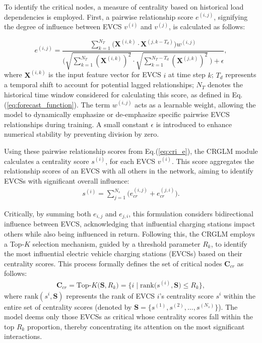 \documentclass[lettersize,journal]{IEEEtran}
\begin{document}
To identify the critical nodes, a measure of centrality based on historical load dependencies is employed.  First, a pairwise relationship score  $e^{(i,j)}$, signifying the degree of influence between EVCS  $v^{(i)}$  and  $v^{(j)}$, is calculated as follows:

\begin{equation}
	e^{(i,j)} = \frac{\sum_{k=1}^{N_T} \Big(\bm{X}^{(i,k)} \cdot \bm{X}^{(j,k-T_d)} \Big) w^{(i,j)}}{\Big(\sqrt{\sum_{k=1}^{N_T} (\bm{X}^{(i,k)})^2} \cdot \sqrt{\sum_{k=1}^{N_T-T_d} (\bm{X}^{(j,k)})^2} ~\Big) + \epsilon},
	\label{eq:cri_e}
\end{equation}
where $\bm{X}^{(i,k)}$ is the input feature vector for EVCS $i$ at time step $k$; $T_d$ represents a temporal shift to account for potential lagged relationships; $N_T$ denotes the historical time window considered for calculating this score, as defined in Eq.(\ref{eq:forecast_function}). The term  $w^{(i,j)}$ acts as a learnable weight, allowing the model to dynamically emphasize or de-emphasize specific pairwise EVCS relationships during training. A small constant $\epsilon$ is introduced to enhance numerical stability by preventing division by zero.   

Using these pairwise relationship scores from  Eq.(\ref{eq:cri_e}), the CRGLM module calculates a centrality score $s^{(i)}$,  for each EVCS $v^{(i)}$.  This score aggregates the relationship scores of an EVCS with all others in the network, aiming to identify EVCSs with significant overall influence:
\begin{equation}
    \begin{aligned}
            s^{(i)} = \sum_{j=1}^{N_s} \Big(e^{(i,j)}_{cr} + e^{(j,i)}_{cr}\Big). 
    \end{aligned}
    \label{eq:centrality_score}
\end{equation} 

Critically, by summing both $e_{i,j}$ and  $e_{j,i}$, this formulation considers bidirectional influence between EVCS, acknowledging that influential charging stations impact others while also being influenced in return. 
Following this, the CRGLM employs a Top-$K$ selection mechanism, guided by a threshold parameter $R_k$, to identify the most influential electric vehicle charging stations (EVCSs) based on their centrality scores. This process formally defines the set of critical nodes $\bm{C}_{cr}$ as follows:
\begin{equation}
    \begin{aligned}
            \bm{C}_{cr} = \text{Top-$K$}\Big(\bm{S}, R_k \Big) =  \Big\{i \mid \text{rank} \Big(s^{(i)}, \bm{S}\Big)  \le   R_k \Big\},
    \end{aligned}
    \label{eq:critical_nodes}
\end{equation}  
where $\text{rank} (s^{i}, \bm{S})$ represents the rank of EVCS $i$'s centrality score $s^{i}$ within the entire set of centrality scores (denoted by $\bm{S} = \{s^{(1)}, s^{(2)},\ldots, s^{(N_s)} \}$). The model deems only those EVCSs as critical whose centrality scores fall within the top $R_k$ proportion, thereby concentrating its attention on the most significant interactions.
\end{document}
